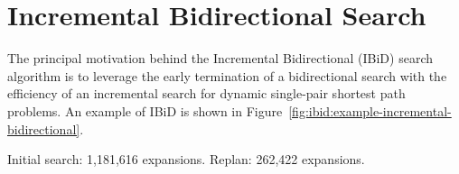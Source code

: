 
\section{Incremental Bidirectional Search}
\label{sef:ibid:ibid}

The principal motivation behind
the Incremental Bidirectional (IBiD) search algorithm
is to leverage the early termination of a bidirectional search
with the efficiency of an incremental search for dynamic
single-pair shortest path problems.
An example of IBiD is shown in
Figure~\ref{fig:ibid:example-incremental-bidirectional}.
\begin{marginfigure}%
   \centering%
   
   \caption{Initial search: 1,181,616 expansions.
      Replan: 262,422 expansions.}%
   \label{fig:ibid:example-incremental-bidirectional}%
\end{marginfigure}

